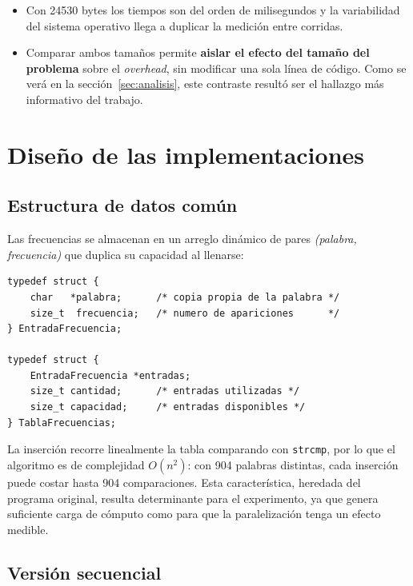 \documentclass[11pt,letterpaper]{article}
\begin{document}
\begin{itemize}
  \item Con \num{24530} bytes los tiempos son del orden de milisegundos y la
        variabilidad del sistema operativo llega a duplicar la medición entre
        corridas.
  \item Comparar ambos tamaños permite \textbf{aislar el efecto del tamaño del
        problema} sobre el \emph{overhead}, sin modificar una sola línea de
        código. Como se verá en la sección~\ref{sec:analisis}, este contraste
        resultó ser el hallazgo más informativo del trabajo.
\end{itemize}

\section{Diseño de las implementaciones}

\subsection{Estructura de datos común}

Las frecuencias se almacenan en un arreglo dinámico de pares
\emph{(palabra, frecuencia)} que duplica su capacidad al llenarse:

\begin{lstlisting}[caption={Estructura de la tabla de frecuencias}]
typedef struct {
    char   *palabra;      /* copia propia de la palabra */
    size_t  frecuencia;   /* numero de apariciones      */
} EntradaFrecuencia;

typedef struct {
    EntradaFrecuencia *entradas;
    size_t cantidad;      /* entradas utilizadas */
    size_t capacidad;     /* entradas disponibles */
} TablaFrecuencias;
\end{lstlisting}

La inserción recorre linealmente la tabla comparando con \texttt{strcmp}, por lo
que el algoritmo es de complejidad \textbf{$O(n^2)$}: con 904 palabras distintas,
cada inserción puede costar hasta 904 comparaciones. Esta característica,
heredada del programa original, resulta determinante para el experimento, ya que
genera suficiente carga de cómputo como para que la paralelización tenga un
efecto medible.

\subsection{Versión secuencial}
\end{document}
